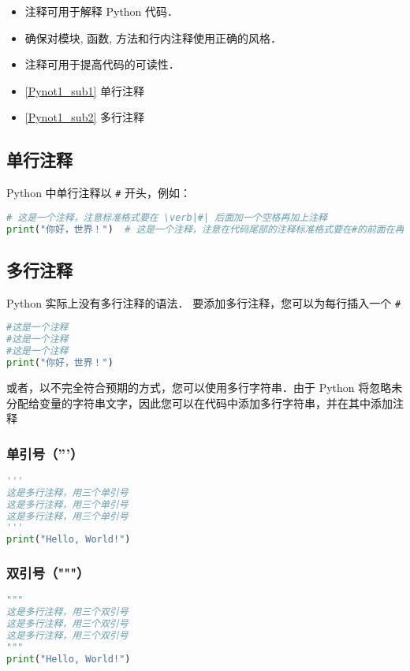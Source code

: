 
\begin{itemize}
\item 注释可用于解释 Python 代码．
\item 确保对模块, 函数, 方法和行内注释使用正确的风格．
\item 注释可用于提高代码的可读性．
\end{itemize}

\begin{itemize}
\item \autoref{Pynot1_sub1} 单行注释
\item \autoref{Pynot1_sub2} 多行注释
\end{itemize}

\subsection{单行注释}\label{Pynot1_sub1}
Python 中单行注释以 \verb|#| 开头，例如：
\begin{lstlisting}[language=python]
# 这是一个注释，注意标准格式要在 \verb|#| 后面加一个空格再加上注释
print("你好，世界！")  # 这是一个注释，注意在代码尾部的注释标准格式要在#的前面在再加两个空格
\end{lstlisting}

\subsection{多行注释}\label{Pynot1_sub2}
Python 实际上没有多行注释的语法．
要添加多行注释，您可以为每行插入一个 \verb|#|
\begin{lstlisting}[language=python]
#这是一个注释
#这是一个注释
#这是一个注释
print("你好，世界！")
\end{lstlisting}

或者，以不完全符合预期的方式，您可以使用多行字符串．由于 Python 将忽略未分配给变量的字符串文字，因此您可以在代码中添加多行字符串，并在其中添加注释
\subsubsection{单引号（'''）}
\begin{lstlisting}[language=python]
'''
这是多行注释，用三个单引号
这是多行注释，用三个单引号 
这是多行注释，用三个单引号
'''
print("Hello, World!")
\end{lstlisting}

\subsubsection{双引号（"""）}
\begin{lstlisting}[language=python]
"""
这是多行注释，用三个双引号
这是多行注释，用三个双引号 
这是多行注释，用三个双引号
"""
print("Hello, World!")
\end{lstlisting}
